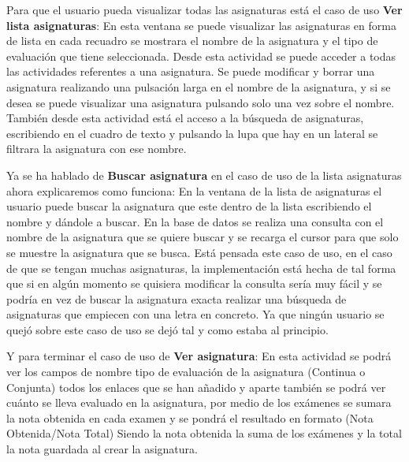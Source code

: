 Para que el usuario pueda visualizar todas las asignaturas está el caso de uso \textbf{Ver lista asignaturas}:
En esta ventana se puede visualizar las asignaturas en forma de lista en cada recuadro se mostrara el nombre de la asignatura y el tipo de evaluación que tiene seleccionada.
Desde esta actividad se puede acceder a todas las actividades referentes a una asignatura. Se puede modificar y borrar una asignatura realizando una pulsación larga en el nombre de la asignatura, y si se desea se puede visualizar una asignatura pulsando solo una vez sobre el nombre.
También desde esta actividad está el acceso a la búsqueda de asignaturas, escribiendo en el cuadro de texto y pulsando la lupa que hay en un lateral se filtrara la asignatura con ese nombre.

Ya se ha hablado de \textbf{Buscar asignatura} en el caso de uso de la lista asignaturas ahora explicaremos como funciona: 
En la ventana de la lista de asignaturas el usuario puede buscar la asignatura que este dentro de la lista escribiendo el nombre y dándole a buscar.
En la base de datos se realiza una consulta con el nombre de la asignatura que se quiere buscar y se recarga el cursor para que solo se muestre la asignatura que se busca.
Está pensada este caso de uso, en el caso de que se tengan muchas asignaturas, la implementación está hecha de tal forma que si en algún momento se quisiera modificar la consulta sería muy fácil y se podría en vez de buscar la asignatura exacta realizar una búsqueda de asignaturas que empiecen con una letra en concreto. 
Ya que ningún usuario se quejó sobre este caso de uso se dejó tal y como estaba al principio.

Y para terminar el caso de uso de \textbf{Ver asignatura}:
En esta actividad se podrá ver los campos de nombre tipo de evaluación de la asignatura (Continua o Conjunta) todos los enlaces que se han añadido y aparte también se podrá ver cuánto se lleva evaluado en la asignatura, por medio de los exámenes se sumara la nota obtenida en cada examen y se pondrá el resultado en formato (Nota Obtenida/Nota Total)
Siendo la nota obtenida la suma de los exámenes y la total la nota guardada al crear la asignatura.

